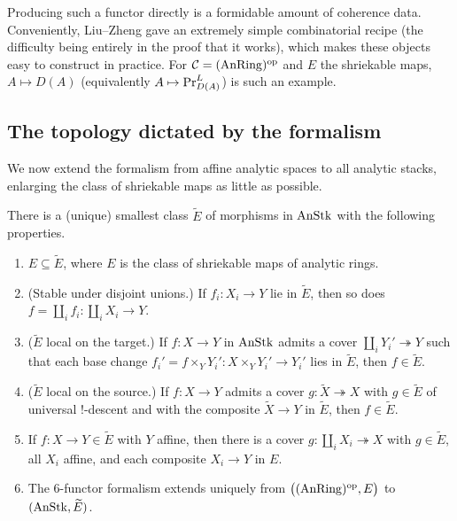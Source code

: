 Producing such a functor directly is a formidable amount of coherence data.
Conveniently, Liu--Zheng gave an extremely simple combinatorial recipe (the
difficulty being entirely in the proof that it works), which makes these objects
easy to construct in practice. For $\mathcal C=(\operatorname{AnRing})^{\mathrm{op}}$ and $E$
the shriekable maps, $A\mapsto D(A)$ (equivalently $A\mapsto\mathrm{Pr}^{L}_{D(A)}$) is such
an example.

\subsection{The topology dictated by the formalism}
\label{subsec:21:topology}

We now extend the formalism from affine analytic spaces to all analytic stacks,
enlarging the class of shriekable maps as little as possible.

\begin{theorem}
\label{thm:21:minimal-class}
There is a (unique) smallest class $\widetilde E$ of morphisms in $\operatorname{AnStk}$ with
the following properties.
\begin{enumerate}
\item $E\subseteq\widetilde E$, where $E$ is the class of shriekable maps of
analytic rings.
\item \textup{(Stable under disjoint unions.)} If $f_i\colon X_i\to Y$ lie in
$\widetilde E$, then so does $f=\coprod_i f_i\colon\coprod_i X_i\to Y$.
\item \textup{($\widetilde E$ local on the target.)} If $f\colon X\to Y$ in
$\operatorname{AnStk}$ admits a cover $\coprod_i Y_i'\twoheadrightarrow Y$ such that each base
change $f_i'=f\times_Y Y_i'\colon X\times_Y Y_i'\to Y_i'$ lies in $\widetilde E$,
then $f\in\widetilde E$.
\item \textup{($\widetilde E$ local on the source.)} If $f\colon X\to Y$ admits a
cover $g\colon\widetilde X\twoheadrightarrow X$ with $g\in\widetilde E$ of
universal $!$-descent and with the composite $\widetilde X\to Y$ in
$\widetilde E$, then $f\in\widetilde E$.
\item If $f\colon X\to Y\in\widetilde E$ with $Y$ affine, then there is a cover
$g\colon\coprod_i X_i\twoheadrightarrow X$ with $g\in\widetilde E$, all $X_i$
affine, and each composite $X_i\to Y$ in $E$.
\item The $6$-functor formalism extends uniquely from
$\bigl((\operatorname{AnRing})^{\mathrm{op}},E\bigr)$ to $(\operatorname{AnStk},\widetilde E)$.
\end{enumerate}
\end{theorem}

